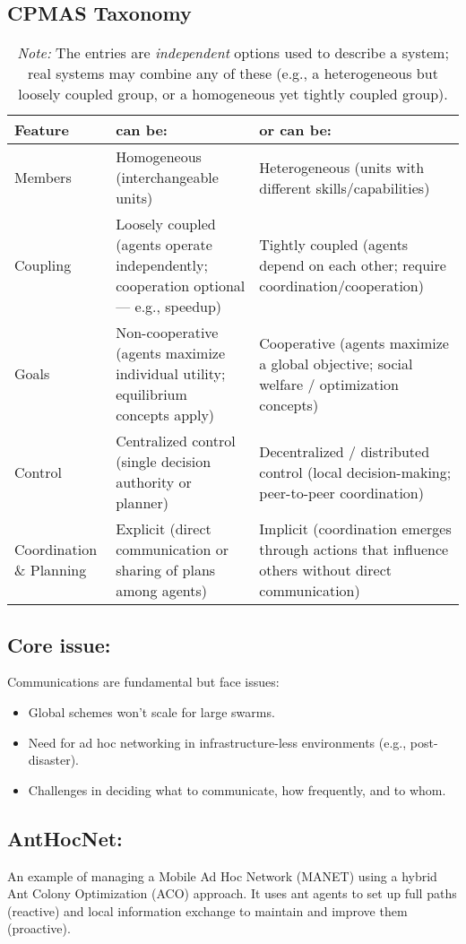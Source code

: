 \subsection*{CPMAS Taxonomy}
\begin{table}[h!]
\centering
\renewcommand{\arraystretch}{1.2}
\begin{tabularx}{\textwidth}{@{}l|X|X@{}}
\toprule
\textbf{Feature} & \textbf{can be:} & \textbf{or can be:} \\ \midrule
Members & Homogeneous (interchangeable units) & Heterogeneous (units with different skills/capabilities) \\ \addlinespace
Coupling & Loosely coupled (agents operate independently; cooperation optional — e.g., speedup) & Tightly coupled (agents depend on each other; require coordination/cooperation) \\ \addlinespace
Goals & Non-cooperative (agents maximize individual utility; equilibrium concepts apply) & Cooperative (agents maximize a global objective; social welfare / optimization concepts) \\ \addlinespace
Control & Centralized control (single decision authority or planner) & Decentralized / distributed control (local decision-making; peer-to-peer coordination) \\ \addlinespace
Coordination \& Planning & Explicit (direct communication or sharing of plans among agents) & Implicit (coordination emerges through actions that influence others without direct communication) \\
\end{tabularx}
\caption{\small\emph{Note:} The entries are \emph{independent} options used to describe a system; real systems may combine any of these (e.g., a heterogeneous but loosely coupled group, or a homogeneous yet tightly coupled group).}
\label{tab:multiagent-taxonomy}
\end{table}

\subsection*{Core issue:} Communications are fundamental but face issues:

\begin{itemize}
    \item Global schemes won't scale for large swarms.
    \item Need for ad hoc networking in infrastructure-less environments (e.g., post-disaster).
    \item Challenges in deciding what to communicate, how frequently, and to whom.
\end{itemize}

\subsection*{AntHocNet:} An example of managing a Mobile Ad Hoc Network (MANET) using a hybrid Ant Colony Optimization (ACO) approach. It uses ant agents to set up full paths (reactive) and local information exchange to maintain and improve them (proactive).

